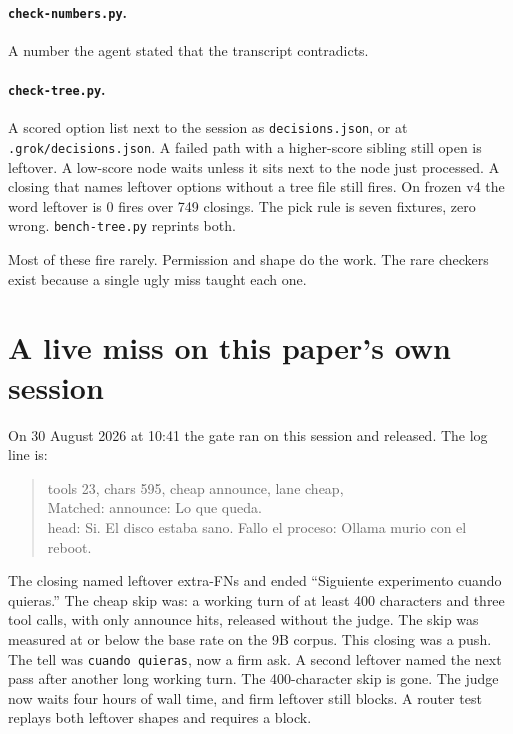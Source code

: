 \paragraph{\texttt{check-numbers.py}.}
A number the agent stated that the transcript contradicts.

\paragraph{\texttt{check-tree.py}.}
A scored option list next to the session as \texttt{decisions.json},
or at \texttt{.grok/decisions.json}. A failed path with a
higher-score sibling still open is leftover. A low-score node waits
unless it sits next to the node just processed. A closing that names
leftover options without a tree file still fires. On frozen v4 the
word leftover is 0 fires over 749 closings. The pick rule is seven
fixtures, zero wrong. \texttt{bench-tree.py} reprints both.

Most of these fire rarely. Permission and shape do the work. The
rare checkers exist because a single ugly miss taught each one.


\section{A live miss on this paper's own session}
\label{app:livemiss}

On 30 August 2026 at 10:41 the gate ran on this session and
released. The log line is:

\begin{quote}
\ttfamily\footnotesize
tools 23, chars 595, cheap announce, lane cheap,\\
Matched: announce: Lo que queda.\\
head: Si. El disco estaba sano. Fallo el proceso: Ollama murio
con el reboot.
\end{quote}

The closing named leftover extra-FNs and ended ``Siguiente
experimento cuando quieras.'' The cheap skip was: a working turn
of at least 400 characters and three tool calls, with only
announce hits, released without the judge. The skip was measured
at or below the base rate on the 9B corpus. This closing was a
push. The tell was \texttt{cuando quieras}, now a firm ask. A
second leftover named the next pass after another long working
turn. The 400-character skip is gone. The judge now waits four
hours of wall time, and firm leftover still blocks. A router test
replays both leftover shapes and requires a block.

